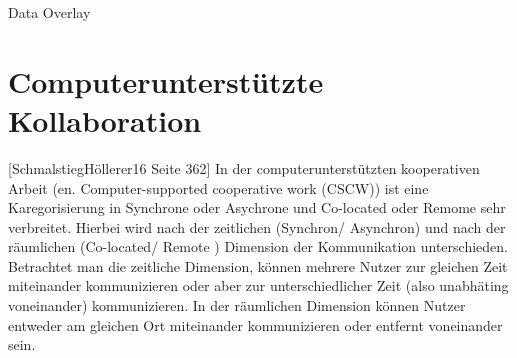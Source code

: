




Data Overlay 




% 


\section{Computerunterstützte Kollaboration}


[SchmalstiegHöllerer16 Seite 362] In der computerunterstützten kooperativen Arbeit (en. Computer-supported cooperative work (CSCW)) ist eine Karegorisierung in Synchrone oder Asychrone und Co-located oder Remome sehr verbreitet. 
Hierbei wird nach der zeitlichen (Synchron/ Asynchron) und nach der räumlichen (Co-located/ Remote ) Dimension der Kommunikation unterschieden. Betrachtet man die zeitliche Dimension, können mehrere Nutzer zur gleichen Zeit miteinander kommunizieren
oder aber zur unterschiedlicher Zeit (also unabhäting voneinander) kommunizieren. In der räumlichen Dimension können Nutzer entweder am gleichen Ort miteinander kommunizieren oder entfernt voneinander sein. 

